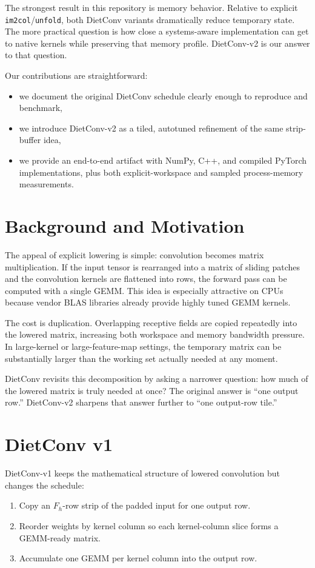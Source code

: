 \documentclass[11pt]{article}
\begin{document}
The strongest result in this repository is memory behavior. Relative to explicit \texttt{im2col}/\texttt{unfold}, both DietConv variants dramatically reduce temporary state. The more practical question is how close a systems-aware implementation can get to native kernels while preserving that memory profile. DietConv-v2 is our answer to that question.

Our contributions are straightforward:
\begin{itemize}
    \item we document the original DietConv schedule clearly enough to reproduce and benchmark,
    \item we introduce DietConv-v2 as a tiled, autotuned refinement of the same strip-buffer idea,
    \item we provide an end-to-end artifact with NumPy, C++, and compiled PyTorch implementations, plus both explicit-workspace and sampled process-memory measurements.
\end{itemize}

\section{Background and Motivation}
The appeal of explicit lowering is simple: convolution becomes matrix multiplication. If the input tensor is rearranged into a matrix of sliding patches and the convolution kernels are flattened into rows, the forward pass can be computed with a single GEMM. This idea is especially attractive on CPUs because vendor BLAS libraries already provide highly tuned GEMM kernels.

The cost is duplication. Overlapping receptive fields are copied repeatedly into the lowered matrix, increasing both workspace and memory bandwidth pressure. In large-kernel or large-feature-map settings, the temporary matrix can be substantially larger than the working set actually needed at any moment.

DietConv revisits this decomposition by asking a narrower question: how much of the lowered matrix is truly needed at once? The original answer is ``one output row.'' DietConv-v2 sharpens that answer further to ``one output-row tile.''

\section{DietConv v1}
DietConv-v1 keeps the mathematical structure of lowered convolution but changes the schedule:
\begin{enumerate}
    \item Copy an $F_h$-row strip of the padded input for one output row.
    \item Reorder weights by kernel column so each kernel-column slice forms a GEMM-ready matrix.
    \item Accumulate one GEMM per kernel column into the output row.
\end{enumerate}
\end{document}
